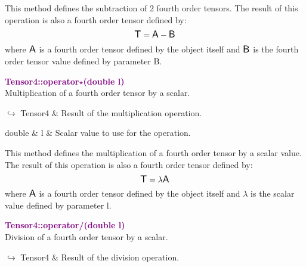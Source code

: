 This method defines the subtraction of 2 fourth order tensors.
The result of this operation is also a fourth order tensor defined by:
\begin{equation*}
\mbox{\large\ensuremath{\mathsf{T}}} = \mbox{\large\ensuremath{\mathsf{A}}} - \mbox{\large\ensuremath{\mathsf{B}}}
\end{equation*}
where $\mbox{\large\ensuremath{\mathsf{A}}}$ is a fourth order tensor defined by the object itself and $\mbox{\large\ensuremath{\mathsf{B}}}$ is the fourth order tensor value defined by parameter B.

\textcolor{purple}{\textbf{Tensor4::operator$\star$(double l)}}\label{Tensor4::operator*(double l)}\\
Multiplication of a fourth order tensor by a scalar.\vspace*{-0.5em}
\begin{tcolorbox}[grow to left by=-1cm, width=\textwidth-1cm,myArgs,tabularx={l|R}]
$\hookrightarrow$ Tensor4 & Result of the multiplication operation.
\end{tcolorbox}

\begin{tcolorbox}[width=\textwidth,myArgs,tabularx={ll|R}]
double & l & Scalar value to use for the operation.
\end{tcolorbox}

This method defines the multiplication of a fourth order tensor by a scalar value.
The result of this operation is also a fourth order tensor defined by:
\begin{equation*}
\mbox{\large\ensuremath{\mathsf{T}}} = \lambda \mbox{\large\ensuremath{\mathsf{A}}}
\end{equation*}
where $\mbox{\large\ensuremath{\mathsf{A}}}$ is a fourth order tensor defined by the object itself and $\lambda$ is the scalar value defined by parameter l.

\textcolor{purple}{\textbf{Tensor4::operator/(double l)}}\label{Tensor4::operator/(double l)}\\
Division of a fourth order tensor by a scalar.\vspace*{-0.5em}
\begin{tcolorbox}[grow to left by=-1cm, width=\textwidth-1cm,myArgs,tabularx={l|R}]
$\hookrightarrow$ Tensor4 & Result of the division operation.
\end{tcolorbox}

